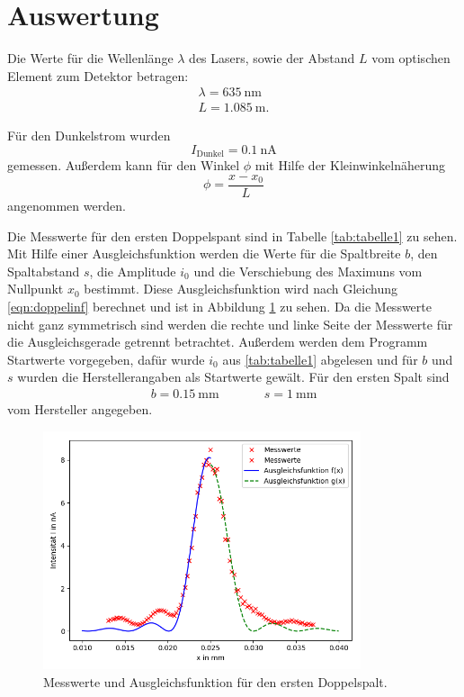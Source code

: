 \section{Auswertung}
\label{sec:Auswertung}
Die Werte für die Wellenlänge $\lambda$ des Lasers, sowie der Abstand $L$ vom optischen Element zum
Detektor betragen:
\begin{align*}
  \lambda=\SI{635}{\nm}\\
  L=\SI{1,085}{\m}.
\end{align*}

Für den Dunkelstrom wurden
\begin{equation*}
   I_{\text{Dunkel}}=\SI{0.1}{\nA}
\end{equation*}
gemessen. Außerdem kann für den Winkel $\phi$ mit Hilfe der Kleinwinkelnäherung
\begin{equation}
  \phi= \frac{x-x_{0}}{L}
\end{equation}
angenommen werden.

Die Messwerte für den ersten Doppelspant sind in Tabelle \ref{tab:tabelle1} zu sehen.
Mit Hilfe einer Ausgleichsfunktion werden die Werte für die Spaltbreite $b$, den
Spaltabstand $s$, die Amplitude $i_0$ und die Verschiebung des Maximuns vom Nullpunkt $x_{0}$ bestimmt.
Diese Ausgleichsfunktion wird nach Gleichung \ref{eqn:doppelinf} berechnet und ist in
Abbildung \ref{fig:plot1} zu sehen. Da die Messwerte nicht ganz symmetrisch sind werden
die rechte und linke Seite der Messwerte für die Ausgleichsgerade getrennt betrachtet.
Außerdem werden dem Programm Startwerte vorgegeben, dafür wurde $i_0$ aus \ref{tab:tabelle1}
abgelesen und für $b$ und $s$ wurden die Herstellerangaben als Startwerte gewält.
Für den ersten Spalt sind
\begin{align*}
  b=\SI{0,15}{\mm} &\;\;\;\;\;\;\;\;\;\; s=\SI{1}{\mm}
\end{align*}
vom Hersteller angegeben.


\begin{figure}
  \centering
  \includegraphics[height=7cm]{Figure_1.png}
  \caption{Messwerte und Ausgleichsfunktion für den ersten Doppelspalt.}
  \label{fig:plot1}
\end{figure}

